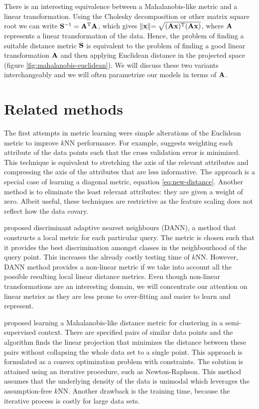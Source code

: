 There is an interesting equivalence between a Mahalanobis-like metric and a linear transformation. Using the Cholesky decomposition or other matrix square root we can write $\mathbf{S}^{-1}=\mathbf{A}^\textrm{T}\mathbf{A}$, which gives $\lVert \mathbf{x} \lVert = \sqrt{(\mathbf{A}\mathbf{x})^\textrm{T}(\mathbf{A}\mathbf{x})}$, where $\mathbf{A}$ represents a linear transformation of the data. Hence, the problem of finding a suitable distance metric $\mathbf{S}$ is equivalent to the problem of finding a good linear transformation $\mathbf{A}$ and then applying Euclidean distance in the projected space (figure \ref{fig:mahalanobis-euclidean}). We will discuss these two variants interchangeably and we will often parametrize our models in terms of $\mathbf{A}$.

\section{Related methods}
\label{sec:related-methods}

The first attempts in metric learning were simple alterations of the Euclidean metric to improve $k$NN performance. For example, \citet{mitchell1997} suggests weighting each attribute of the data points such that the cross validation error is minimized. This technique is equivalent to stretching the axis of the relevant attributes and compressing the axis of the attributes that are less informative. The approach is a special case of learning a diagonal metric, equation \eqref{eq:new-distance}. Another method \citep{moore1994} is to eliminate the least relevant attributes: they are given a weight of zero. Albeit useful, these techniques are restrictive as the feature scaling does not reflect how the data covary.

\citet{hastie1996} proposed discriminant adaptive nearest neighbours (DANN), a method that constructs a local metric for each particular query. The metric is chosen such that it provides the best discrimination amongst classes in the neighbourhood of the query point. This increases the already costly testing time of $k$NN. However, DANN method provides a non-linear metric if we take into account all the possible resulting local linear distance metrics. Even though non-linear transformations are an interesting domain, we will concentrate our attention on linear metrics as they are less prone to over-fitting and easier to learn and represent.

\citet{xing2003} proposed learning a Mahalanobis-like distance metric for clustering in a semi-supervised context. There are specified pairs of similar data points and the algorithm finds the linear projection that minimizes the distance between these pairs without collapsing the whole data set to a single point. This approach is formulated as a convex optimization problem with constraints. The solution is attained using an iterative procedure, such as Newton-Raphson. This method assumes that the underlying density of the data is unimodal which leverages the assumption-free $k$NN. Another drawback is the training time, because the iterative process is costly for large data sets.

